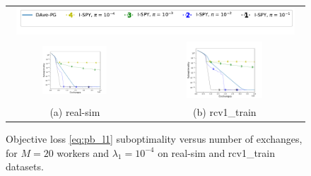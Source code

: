 \begin{figure}[t!]
\begin{tabular}{cc}
\multicolumn{2}{c}{\vspace{-4pt}\includegraphics[width = 0.96\textwidth]{SODA/Figs/legend.pdf}}\\
\includegraphics[width = 0.5\textwidth]{SODA/Figs/real-sim_20w_00001_0001_fun_vs_ex_log.pdf} & 
\includegraphics[width = 0.5\textwidth]{SODA/Figs/rcv_20w_00001_0001_fun_vs_ex_log.pdf}\\
(a) real-sim & (b) rcv1\_train
\end{tabular}
    \caption{Objective loss \eqref{eq:pb_l1} suboptimality versus number of exchanges, for $M=20$ workers and $\lambda_1 = 10^{-4}$ on real-sim  and rcv1\_train datasets.}
    \label{fig:communication}
\end{figure}

